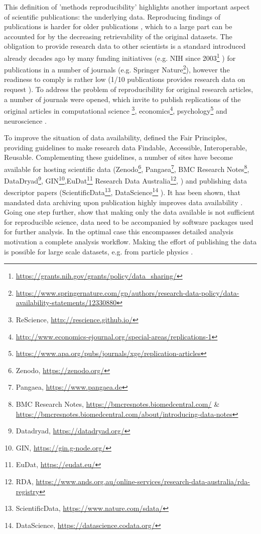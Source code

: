 This definition of 'methods reproducibility' highlights another important aspect of scientific publications: the underlying data. Reproducing findings of publications is harder for older publications \citep{Vines_2013}, which to a large part can be accounted for by the decreasing retrievability of the original datasets. The obligation to provide research data to other scientists is a standard introduced already decades ago by many funding initiatives (e.g. NIH since 2003\footnote{\url{https://grants.nih.gov/grants/policy/data_sharing/}} ) for publications in a number of journals (e.g. Springer Nature\footnote{\url{https://www.springernature.com/gp/authors/research-data-policy/data-availability-statements/12330880}}), however the readiness to comply is rather low (1/10 publications provides research data on request \citep{Savage_2009}). To address the problem of reproducibility for original research articles, a number of journals were opened, which invite to publish replications of the original articles in computational science \footnote{ReScience, \url{http://rescience.github.io/}}, economics\footnote{\url{http://www.economics-ejournal.org/special-areas/replications-1}}, psychology\footnote{\url{https://www.apa.org/pubs/journals/xge/replication-articles}} and neuroscience \citep{Yeung_2017}.

To improve the situation of data availability, \citet{Wilkinson_2016} defined the Fair Principles, providing guidelines to make research data Findable, Accessible, Interoperable, Reusable. Complementing these guidelines, a number of sites have become available for hosting scientific data (Zenodo\footnote{Zenodo, \url{https://zenodo.org/}}, Pangaea\footnote{Pangaea, \url{https://www.pangaea.de}}, BMC Research Notes\footnote{BMC Research Notes, \url{https://bmcresnotes.biomedcentral.com/} \& \url{https://bmcresnotes.biomedcentral.com/about/introducing-data-notes}}, DataDryad\footnote{Datadryad, \url{https://datadryad.org/}}, GIN\footnote{GIN, \url{https://gin.g-node.org/}},EuDat\footnote{EuDat, \url{https://eudat.eu/}} Research Data Australia\footnote{RDA, \url{https://www.ands.org.au/online-services/research-data-australia/rda-registry}}, \citep{Assante_2016}) and publishing data descriptor papers (ScientificData\footnote{ScientificData, \url{https://www.nature.com/sdata/}}, DataScience\footnote{DataScience, \url{https://datascience.codata.org/}} \citep{Candela_2015}).
It has been shown, that mandated data archiving upon publication highly improves data availability \citep{Vines_2013}. Going one step further, \citet{Chen_2019} show that making only the data available is not sufficient for reproducible science, data need to be accompanied by software packages used for further analysis. In the optimal case this encompasses detailed analysis motivation a complete analysis workflow. Making the effort of publishing the data is possible for large scale datasets, e.g. from particle physics \citep{Jomhari_2017}.

